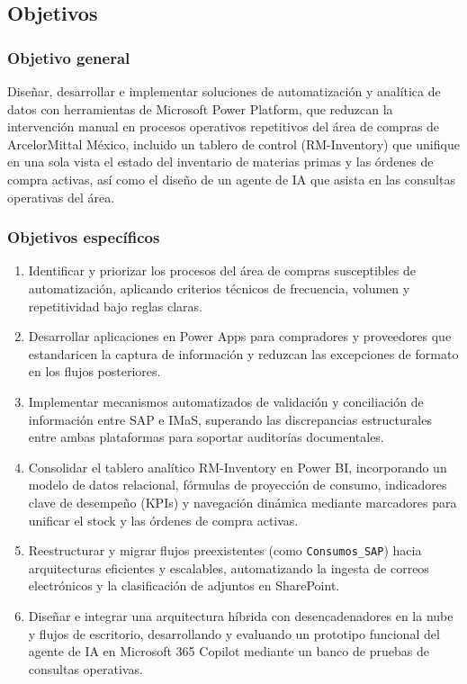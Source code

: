 \subsection{Objetivos} \label{sec:objetivos} %

\subsubsection{Objetivo general} \label{subsec:objetivo_general}
Diseñar, desarrollar e implementar soluciones de automatización y analítica de datos con herramientas de Microsoft Power Platform, que reduzcan la intervención manual en procesos operativos repetitivos del área de compras de ArcelorMittal México, incluido un tablero de control (RM-Inventory) que unifique en una sola vista el estado del inventario de materias primas y las órdenes de compra activas, así como el diseño de un agente de IA que asista en las consultas operativas del área.

\subsubsection{Objetivos específicos} \label{subsec:objetivos_especificos}

\begin{enumerate}
    \item Identificar y priorizar los procesos del área de compras susceptibles de automatización, aplicando criterios técnicos de frecuencia, volumen y repetitividad bajo reglas claras.
    \item Desarrollar aplicaciones en Power Apps para compradores y proveedores que estandaricen la captura de información y reduzcan las excepciones de formato en los flujos posteriores.
    \item Implementar mecanismos automatizados de validación y conciliación de información entre SAP e IMaS, superando las discrepancias estructurales entre ambas plataformas para soportar auditorías documentales.
    \item Consolidar el tablero analítico RM-Inventory en Power BI, incorporando un modelo de datos relacional, fórmulas de proyección de consumo, indicadores clave de desempeño (KPIs) y navegación dinámica mediante marcadores para unificar el stock y las órdenes de compra activas.
    \item Reestructurar y migrar flujos preexistentes (como \texttt{Consumos\_SAP}) hacia arquitecturas eficientes y escalables, automatizando la ingesta de correos electrónicos y la clasificación de adjuntos en SharePoint.
    \item Diseñar e integrar una arquitectura híbrida con desencadenadores en la nube y flujos de escritorio, desarrollando y evaluando un prototipo funcional del agente de IA en Microsoft 365 Copilot mediante un banco de pruebas de consultas operativas.
\end{enumerate}

